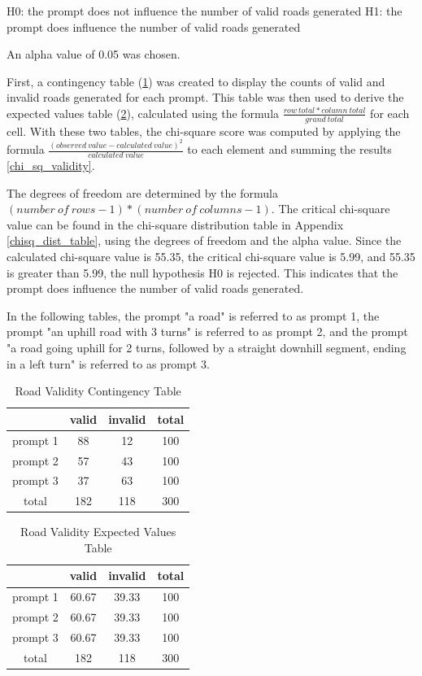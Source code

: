 H0: the prompt does not influence the number of valid roads generated
H1: the prompt does influence the number of valid roads generated

An alpha value of 0.05 was chosen.

First, a contingency table (\ref{contingency_validity}) was created to display the counts of valid and invalid roads generated for each prompt. This table was then used to derive the expected values table (\ref{expected_values_validity}), calculated using the formula \(\frac{row\ total * column\ total}{grand\ total}\) for each cell. With these two tables, the chi-square score was computed by applying the formula \(\frac{(observed\ value - calculated\ value)^2}{calculated\ value}\) to each element and summing the results \ref{chi_sq_validity}.

The degrees of freedom are determined by the formula \((number\ of\ rows - 1) * (number\ of\ columns - 1)\). The critical chi-square value can be found in the chi-square distribution table in Appendix \ref{chisq_dist_table}, using the degrees of freedom and the alpha value. Since the calculated chi-square value is 55.35, the critical chi-square value is 5.99, and 55.35 is greater than 5.99, the null hypothesis H0 is rejected. This indicates that the prompt does influence the number of valid roads generated.

In the following tables, the prompt "a road" is referred to as prompt 1, the prompt "an uphill road with 3 turns" is referred to as prompt 2, and the prompt "a road going uphill for 2 turns, followed by a straight downhill segment, ending in a left turn" is referred to as prompt 3.


\begin{table}[H]
    \centering
    \begin{tabular}{|c|c|c|c|} \hline 
         &  valid&  invalid& total\\ \hline 
         prompt 1&  88&  12& 100\\ \hline 
         prompt 2&  57&  43& 100\\ \hline 
         prompt 3&  37&  63& 100\\ \hline 
         total&  182&  118& 300\\ \hline
    \end{tabular}
    \caption{Road Validity Contingency Table}
    \label{contingency_validity}
\end{table}

\begin{table}[H]
    \centering
    \begin{tabular}{|c|c|c|c|} \hline 
         &  valid&  invalid& total\\ \hline 
         prompt 1&  60.67&  39.33& 100\\ \hline 
         prompt 2&  60.67&  39.33& 100\\ \hline 
         prompt 3&  60.67&  39.33& 100\\ \hline 
         total&  182&  118& 300\\ \hline
    \end{tabular}
    \caption{Road Validity Expected Values Table}
    \label{expected_values_validity}
\end{table}

